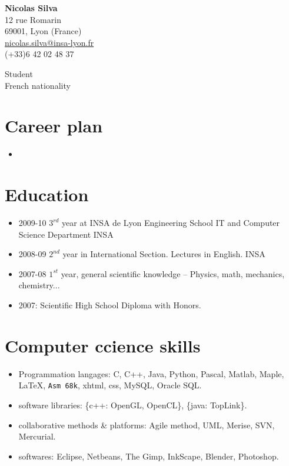 


\begin{minipage}{0.7\linewidth}
\textbf{Nicolas Silva} ~\\
12 rue Romarin ~\\
69001, Lyon (France)~\\
\url{nicolas.silva@insa-lyon.fr} ~\\
(+33)6 42 02 48 37
\end{minipage}

\begin{minipage}{0.2\linewidth}
Student ~\\
French nationality ~\\

\end{minipage}


\section*{Career plan}
	\begin{itemize}
		\item
	\end{itemize}
\section*{Education}
	\begin{itemize}
		\item{2009-10} $3^{rd}$ year at INSA de Lyon Engineering School IT and Computer Science Department INSA 
		\item{2008-09} $2^{nd}$ year in International Section. Lectures in English. INSA
		\item{2007-08} $1^{st}$ year, general scientific knowledge – Physics, math, mechanics, chemistry...
		\item{2007}: Scientific High School Diploma with Honors.
	\end{itemize}
\section*{Computer ccience skills}
	\begin{itemize}
		\item Programmation langages: C, C++, Java, Python, Pascal, Matlab, Maple, \LaTeX, \texttt{Asm 68k}, xhtml, css, MySQL, Oracle SQL. 
		\item software libraries: \{c++: OpenGL, OpenCL\}, \{java: TopLink\}.
		\item collaborative methods & platforms: Agile method, UML, Merise, SVN, Mercurial. 
		\item softwares: Eclipse, Netbeans, The Gimp, InkScape, Blender, Photoshop.
	\end{itemize}

